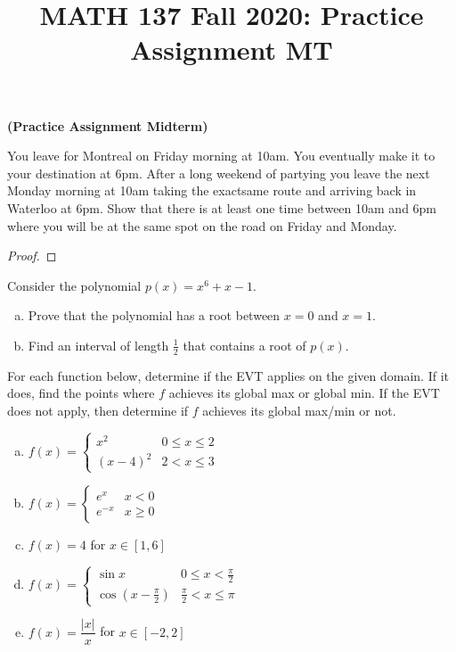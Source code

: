 
\title{MATH 137 Fall 2020: Practice Assignment MT}


\thispagestyle{firstpage}

\textbf{\@title{} (Practice Assignment Midterm)}

\question You leave for Montreal on Friday morning at 10am.
You eventually make it to your destination at 6pm.
After a long weekend of partying you leave the next Monday morning at 10am taking the exactsame route and arriving back in Waterloo at 6pm.
Show that there is at least one time between 10am and 6pm where you will be at the same spot on the road on Friday and Monday.

\begin{proof}

\end{proof}

\question Consider the polynomial $p(x)=x^6+x-1$.
\begin{enumerate}[(a)]
  \item Prove that the polynomial has a root between $x=0$ and $x=1$.
  \item Find an interval of length $\frac{1}{2}$ that contains a root of $p(x)$.
\end{enumerate}

\question For each function below, determine if the EVT applies on the given domain.
If it does, find the points where $f$ achieves its global max or global min.
If the EVT does not apply, then determine if $f$ achieves its global max/min or not.
\begin{enumerate}[(a)]
  \item $f(x)=\begin{cases}
            x^2     & 0 \leq x \leq 2 \\
            (x-4)^2 & 2 < x \leq 3
          \end{cases}$
  \item $f(x)=\begin{cases}
            e^x    & x < 0    \\
            e^{-x} & x \geq 0
          \end{cases}$
  \item $f(x)=4$ for $x \in [1,6]$
  \item $f(x)=\begin{cases}
            \sin x                & 0 \leq x < \frac{\pi}{2}   \\
            \cos(x-\frac{\pi}{2}) & \frac{\pi}{2} < x \leq \pi
          \end{cases}$
  \item $f(x) = \dfrac{|x|}{x}$ for $x \in [-2,2]$
\end{enumerate}

